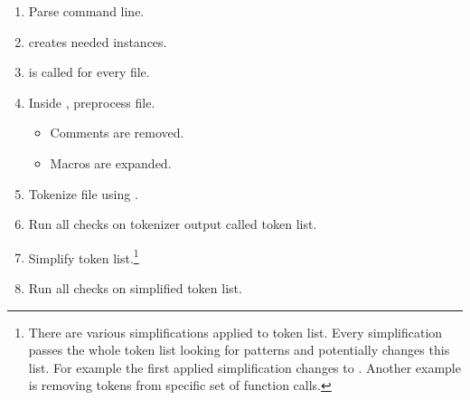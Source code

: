 \begin{enumerate}
\item Parse command line.
\item {} creates needed  instances.
\item {} is called for every file.
\item Inside , preprocess file.
    \begin{itemize}
    \item Comments are removed.
    \item Macros are expanded.
    \end{itemize}
\item Tokenize file using .
\item Run all checks on tokenizer output called token list.
\item Simplify token list.\footnote{There are various simplifications applied to token list. Every simplification passes the whole token list looking for patterns and potentially changes this list. For example the first applied simplification changes  to . Another example is removing  tokens from specific set of function calls.}
\item Run all checks on simplified token list.
\end{enumerate}

